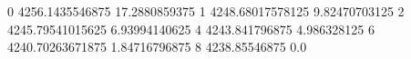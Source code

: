 0 4256.1435546875 17.2880859375
1 4248.68017578125 9.82470703125
2 4245.79541015625 6.93994140625
4 4243.841796875 4.986328125
6 4240.70263671875 1.84716796875
8 4238.85546875 0.0
